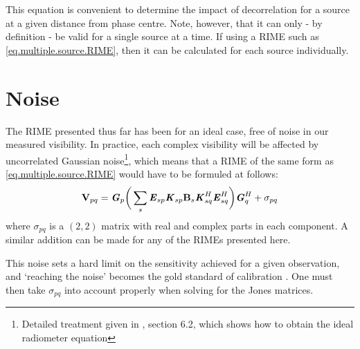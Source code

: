 \pg
This equation is convenient to determine the impact of decorrelation for a source at a given distance from phase centre. Note, however, that it can only - by definition - be valid for a single source at a time. If using a RIME such as \cref{eq.multiple.source.RIME}, then it can be calculated for each source individually.

\section{Noise}
\label{section.RIME.noise}

\pg
The RIME presented thus far has been for an ideal case, free of noise in our measured visibility. In practice, each complex visibility will be affected by uncorrelated Gaussian noise\footnote{Detailed treatment given in , section 6.2, which shows how to obtain the ideal radiometer equation}, which means that a RIME of the same form as \cref{eq.multiple.source.RIME} would have to be formuled at follows:
\begin{equation}
\textbf{V}_{pq} = \textbf{\emph{G}}_p \bigg( \sum_s \textbf{\emph{E}}_{sp} \textbf{\emph{K}}_{sp} \textbf{B}_{s} \textbf{\emph{K}}_{sq}^H \textbf{\emph{E}}_{sq}^H \bigg) \textbf{\emph{G}}_q^H + \sigma_{pq}
\end{equation}
where $\sigma_{pq}$ is a $(2,2)$ matrix with real and complex parts in each component. A similar addition can be made for any of the RIMEs presented here.

\pg
This noise sets a hard limit on the sensitivity achieved for a given observation, and `reaching the noise' becomes the gold standard of calibration . One must then take $\sigma_{pq}$ into account properly when solving for the Jones matrices.



